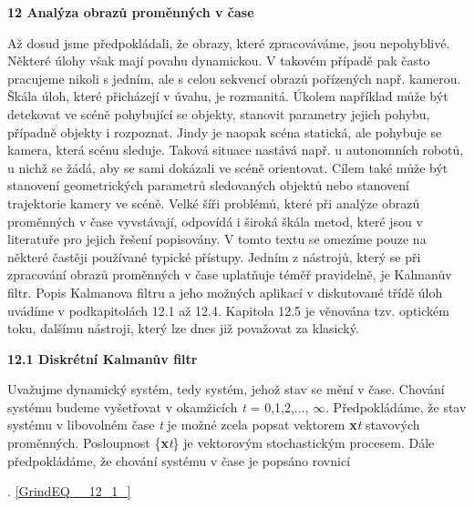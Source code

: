 \noindent \textbf{12  Analýza obrazů proměnných v čase}

\noindent Až dosud jsme předpokládali, že obrazy, které zpracováváme, jsou nepohyblivé. Některé úlohy však mají povahu dynamickou. V takovém případě pak často pracujeme nikoli s jedním, ale s celou sekvencí obrazů pořízených např. kamerou. Škála úloh, které přicházejí v úvahu, je rozmanitá. Úkolem například může být detekovat ve scéně pohybující se objekty, stanovit parametry jejich pohybu, případně objekty i rozpoznat. Jindy je naopak scéna statická, ale pohybuje se kamera, která scénu sleduje. Taková situace nastává např. u autonomních robotů, u nichž se žádá, aby se sami dokázali ve scéně orientovat. Cílem také může být stanovení geometrických parametrů sledovaných objektů nebo stanovení trajektorie kamery ve scéně. Velké šíři problémů, které při analýze obrazů proměnných v čase vyvstávají, odpovídá i široká škála metod, které jsou v literatuře pro jejich řešení popisovány. V tomto textu se omezíme pouze na některé častěji používané typické přístupy. Jedním z nástrojů, který se při zpracování obrazů proměnných v čase uplatňuje téměř pravidelně, je Kalmanův filtr. Popis Kalmanova filtru a jeho možných aplikací v diskutované třídě úloh uvádíme v podkapitolách 12.1 až 12.4. Kapitola 12.5 je věnována tzv. optickém toku, dalšímu nástroji, který lze dnes již považovat za klasický.     

\noindent \textbf{12.1 Diskrétní Kalmanův filtr}

\noindent Uvažujme dynamický systém, tedy systém, jehož stav se mění v čase. Chování systému budeme vyšetřovat v okamžicích \textit{t} = 0,1,2,..., $\infty$. Předpokládáme, že stav systému v libovolném čase \textit{t} je možné zcela popsat vektorem \textbf{x}\textit{t} stavových proměnných. Posloupnost \{\textbf{x}\textit{t}\} je vektorovým stochastickým procesem. Dále předpokládáme, že chování systému v čase je popsáno rovnicí

 . \eqref{GrindEQ__12_1_}


